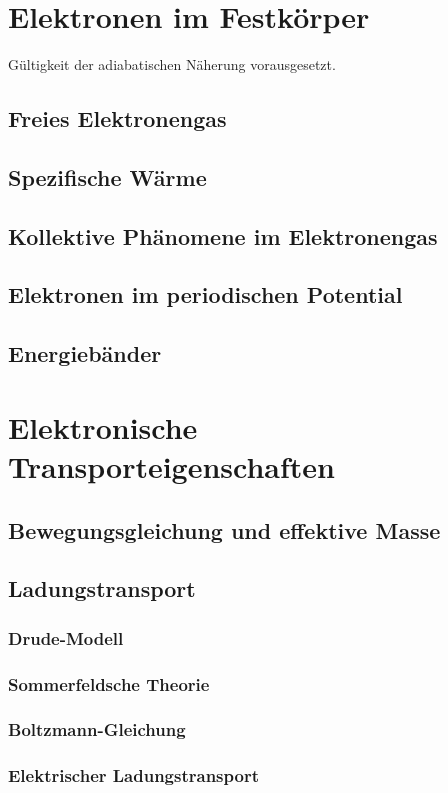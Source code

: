 \documentclass[a4paper,12pt]{article}
\begin{document}
\section{Elektronen im Festkörper}

Gültigkeit der adiabatischen Näherung vorausgesetzt.
\subsection{Freies Elektronengas}
\subsection{Spezifische Wärme}
\subsection{Kollektive Phänomene im Elektronengas}
\subsection{Elektronen im periodischen Potential}
\subsection{Energiebänder}
\section{Elektronische Transporteigenschaften}
\subsection{Bewegungsgleichung und effektive Masse}
\subsection{Ladungstransport}
\subsubsection{Drude-Modell}
\subsubsection{Sommerfeldsche Theorie}
\subsubsection{Boltzmann-Gleichung}
\subsubsection{Elektrischer Ladungstransport}
\end{document}
